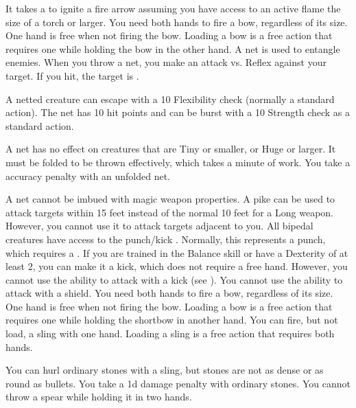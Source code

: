         It takes a  to ignite a fire arrow assuming you have access to an active flame the size of a torch or larger.
         You need both hands to fire a bow, regardless of its size. One hand is free when not firing the bow. Loading a bow is a free action that requires one  while holding the bow in the other hand.
         A net is used to entangle enemies. When you throw a net, you make an attack vs. Reflex against your target. If you hit, the target is \slowed.
        \par A netted creature can escape with a  10 Flexibility check (normally a standard action). The net has 10 hit points and can be burst with a  10 Strength check as a standard action.
        \par A net has no effect on creatures that are Tiny or smaller, or Huge or larger. It must be folded to be thrown effectively, which takes a minute of work. You take a  accuracy penalty with an unfolded net.
        \par A net cannot be imbued with magic weapon properties.
         A pike can be used to attack targets within 15 feet instead of the normal 10 feet for a Long weapon.
        However, you cannot use it to attack targets adjacent to you.
         All bipedal creatures have access to the punch/kick .
        Normally, this represents a punch, which requires a .
        If you are trained in the Balance skill or have a Dexterity of at least 2, you can make it a kick, which does not require a free hand.
        However, you cannot use the  ability to attack with a kick (see ).
         You cannot use the  ability to attack with a shield.
         You need both hands to fire a bow, regardless of its size. One hand is free when not firing the bow. Loading a bow is a free action that requires one  while holding the shortbow in another hand.
         You can fire, but not load, a sling with one hand. Loading a sling is a free action that requires both hands.
        \par You can hurl ordinary stones with a sling, but stones are not as dense or as round as bullets. You take a \minus1d damage penalty with ordinary stones.
         You cannot throw a spear while holding it in two hands.
